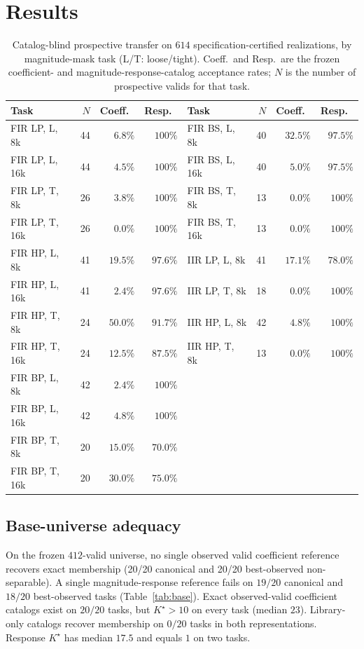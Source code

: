 \documentclass{article}
\begin{document}
\FloatBarrier
\section{Results}
\label{sec:results}
\begin{table}[t]
\centering
\caption{Catalog-blind prospective transfer on $614$
specification-certified realizations, by magnitude-mask task
(L/T: loose/tight).
Coeff.\ and Resp.\ are the frozen coefficient- and
magnitude-response-catalog acceptance rates; $N$ is the number of
prospective valids for that task.}
\label{tab:transfer}
\setlength{\tabcolsep}{4pt}
\footnotesize
\begin{tabular}{@{}lrrr@{}|lrrr@{}}
\toprule
Task & $N$ & Coeff.\ & Resp.\ & Task & $N$ & Coeff.\ & Resp.\ \\
\midrule
FIR LP, L, 8k  & 44 & $6.8\%$  & $100\%$ & FIR BS, L, 8k  & 40 & $32.5\%$ & $97.5\%$ \\
FIR LP, L, 16k & 44 & $4.5\%$  & $100\%$ & FIR BS, L, 16k & 40 & $5.0\%$  & $97.5\%$ \\
FIR LP, T, 8k  & 26 & $3.8\%$  & $100\%$ & FIR BS, T, 8k  & 13 & $0.0\%$  & $100\%$ \\
FIR LP, T, 16k & 26 & $0.0\%$  & $100\%$ & FIR BS, T, 16k & 13 & $0.0\%$  & $100\%$ \\
FIR HP, L, 8k  & 41 & $19.5\%$ & $97.6\%$ & IIR LP, L, 8k  & 41 & $17.1\%$ & $78.0\%$ \\
FIR HP, L, 16k & 41 & $2.4\%$  & $97.6\%$ & IIR LP, T, 8k  & 18 & $0.0\%$  & $100\%$ \\
FIR HP, T, 8k  & 24 & $50.0\%$ & $91.7\%$ & IIR HP, L, 8k  & 42 & $4.8\%$  & $100\%$ \\
FIR HP, T, 16k & 24 & $12.5\%$ & $87.5\%$ & IIR HP, T, 8k  & 13 & $0.0\%$  & $100\%$ \\
FIR BP, L, 8k  & 42 & $2.4\%$  & $100\%$ &                &    &          & \\
FIR BP, L, 16k & 42 & $4.8\%$  & $100\%$ &                &    &          & \\
FIR BP, T, 8k  & 20 & $15.0\%$ & $70.0\%$ &                &    &          & \\
FIR BP, T, 16k & 20 & $30.0\%$ & $75.0\%$ &                &    &          & \\
\bottomrule
\end{tabular}
\end{table}

\subsection{Base-universe adequacy}
On the frozen $412$-valid universe, no single observed valid
coefficient reference recovers exact membership (20/20
canonical and 20/20 best-observed non-separable).
A single magnitude-response reference fails on $19/20$ canonical
and $18/20$ best-observed tasks (Table~\ref{tab:base}).
Exact observed-valid coefficient catalogs exist on $20/20$ tasks,
but $K^\star>10$ on every task (median $23$).
Library-only catalogs recover membership on $0/20$ tasks in both
representations.
Response $K^\star$ has median $17.5$ and equals $1$ on two tasks.
\end{document}
